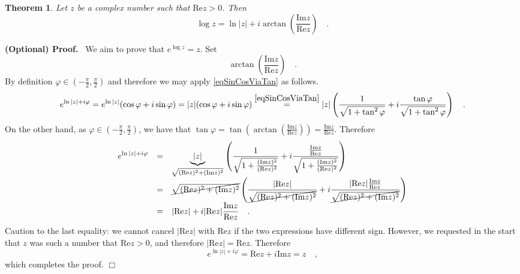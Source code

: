 \documentclass[12pt]{book}
\renewcommand{\Im}{\mathrm{Im}}
\renewcommand{\Re}{\mathrm{Re}}
\newcommand{\importantFormula}[1]{\begin{equation} \boxed{#1} \end{equation}}
\newenvironment{proofOptional}[1][]{ \noindent \textbf{(Optional) Proof#1.}}{$\Box$\medskip}
\newtheorem{theorem}{Theorem}[section]
\begin{document}
\begin{theorem}\label{thLogarithmComplex}
 Let $z$ be a complex number such that $\Re z>0$. Then
\importantFormula{
\log z = \ln |z| + i\arctan \left(\frac{\Im z}{\Re z}\right)\quad .
}
\end{theorem}
\begin{proofOptional}
~We aim to prove that $e^{\log z}=z$. Set
\[
\arctan \left(\frac{\Im z}{\Re z}\right)\quad .
\]
By definition $\varphi\in  (-\frac{\pi}{2}, \frac{\pi}{2})$ and therefore we may apply \eqref{eqSinCosViaTan} as follows.
\[
e^{\ln |z| + i\varphi}= e^{\ln |z|} (\cos\varphi+i\sin\varphi )=|z|(\cos\varphi+i\sin\varphi ) \stackrel{\eqref{eqSinCosViaTan}}{=}
|z| \left(\frac{1}{\sqrt{1+\tan^2\varphi}} +i \frac{\tan \varphi}{\sqrt{1+\tan^2\varphi}} \right)\quad .
\]
On the other hand, as $\varphi\in  (-\frac{\pi}{2}, \frac{\pi}{2})$, we have that $\tan\varphi= \tan\left(\arctan\left(\frac{\Im z}{\Re z}\right)\right)= \frac{\Im z}{\Re z}$. Therefore
\[
\begin{array}{rcl}
\displaystyle e^{\ln |z| + i\varphi}&=&\displaystyle \underbrace{|z|}_{\sqrt{(\Re z)^2+(\Im z)^2}} \left(\frac{1}{\sqrt{1+\frac{(\Im z)^2}{(\Re z)^2}}} +i \frac{\frac{\Im z}{\Re z}}{\sqrt{1+\frac{(\Im z)^2}{(\Re z)^2}}} \right) \\
&=&\displaystyle \cancel{\sqrt{(\Re z)^2+(\Im z)^2}} \left(\frac{|\Re z|}{\cancel{\sqrt{(\Re z)^2+(\Im z)^2}}} +i \frac{|\Re z|\frac{\Im z}{\Re z}}{\cancel{\sqrt{(\Re z)^2+(\Im z)^2}}} \right) \\
&=&\displaystyle|\Re z | + i|\Re z| \frac{\Im z}{\Re z}\quad .
\end{array}
\]
Caution to the last equality: we cannot cancel $|\Re z| $ with $\Re z$ if the two expressions have different sign. However, we requested in the start that $z$ was such a number that $\Re z>0$, and therefore $|\Re z|=\Re z $. Therefore
\[
e^{\ln |z| + i\varphi}=\Re z+i\Im z = z\quad ,
\]
which completes the proof.
\end{proofOptional}
\end{document}
